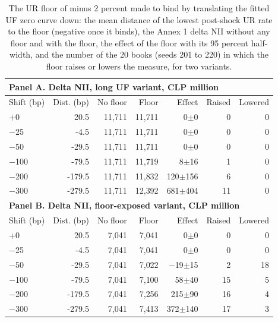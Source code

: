 \begin{table}[htbp]
\centering
\footnotesize
\setlength{\tabcolsep}{3.5pt}
\caption{The UR floor of minus 2 percent made to bind by translating the fitted UF zero curve down: the mean distance of the lowest post-shock UR rate to the floor (negative once it binds), the Annex 1 delta NII without any floor and with the floor, the effect of the floor with its 95 percent half-width, and the number of the 20 books (seeds 201 to 220) in which the floor raises or lowers the measure, for two variants.}
\label{tab:floors}
\begin{tabular}{lrrrrrr}
\toprule
\multicolumn{7}{l}{\textbf{Panel A. Delta NII, long UF variant, CLP million}} \\
\midrule
Shift (bp) & Dist. (bp) & No floor & Floor & Effect & Raised & Lowered \\
\midrule
+0 & 20.5 & 11{,}711 & 11{,}711 & 0$\pm$0 & 0 & 0 \\
$-$25 & -4.5 & 11{,}711 & 11{,}711 & 0$\pm$0 & 0 & 0 \\
$-$50 & -29.5 & 11{,}711 & 11{,}711 & 0$\pm$0 & 0 & 0 \\
$-$100 & -79.5 & 11{,}711 & 11{,}719 & 8$\pm$16 & 1 & 0 \\
$-$200 & -179.5 & 11{,}711 & 11{,}832 & 120$\pm$156 & 6 & 0 \\
$-$300 & -279.5 & 11{,}711 & 12{,}392 & 681$\pm$404 & 11 & 0 \\
\midrule
\multicolumn{7}{l}{\textbf{Panel B. Delta NII, floor-exposed variant, CLP million}} \\
\midrule
Shift (bp) & Dist. (bp) & No floor & Floor & Effect & Raised & Lowered \\
\midrule
+0 & 20.5 & 7{,}041 & 7{,}041 & 0$\pm$0 & 0 & 0 \\
$-$25 & -4.5 & 7{,}041 & 7{,}041 & 0$\pm$0 & 0 & 0 \\
$-$50 & -29.5 & 7{,}041 & 7{,}022 & $-$19$\pm$15 & 2 & 18 \\
$-$100 & -79.5 & 7{,}041 & 7{,}100 & 58$\pm$40 & 15 & 5 \\
$-$200 & -179.5 & 7{,}041 & 7{,}256 & 215$\pm$90 & 16 & 4 \\
$-$300 & -279.5 & 7{,}041 & 7{,}413 & 372$\pm$140 & 17 & 3 \\
\bottomrule
\end{tabular}
\end{table}
